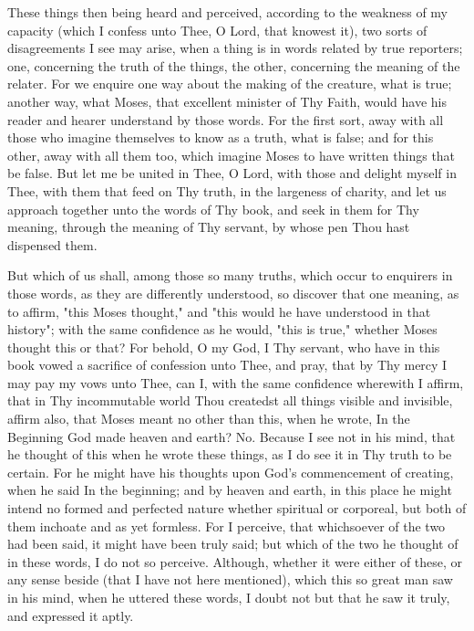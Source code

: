 \documentclass[b5paper,openright,12pt,twoside]{book}
\begin{document}
These things then being heard and perceived, according to the weakness
of my capacity (which I confess unto Thee, O Lord, that knowest it), two
sorts of disagreements I see may arise, when a thing is in words related
by true reporters; one, concerning the truth of the things, the other,
concerning the meaning of the relater. For we enquire one way about
the making of the creature, what is true; another way, what Moses,
that excellent minister of Thy Faith, would have his reader and hearer
understand by those words. For the first sort, away with all those
who imagine themselves to know as a truth, what is false; and for this
other, away with all them too, which imagine Moses to have written
things that be false. But let me be united in Thee, O Lord, with those
and delight myself in Thee, with them that feed on Thy truth, in the
largeness of charity, and let us approach together unto the words of
Thy book, and seek in them for Thy meaning, through the meaning of Thy
servant, by whose pen Thou hast dispensed them.

But which of us shall, among those so many truths, which occur to
enquirers in those words, as they are differently understood, so
discover that one meaning, as to affirm, "this Moses thought," and "this
would he have understood in that history"; with the same confidence
as he would, "this is true," whether Moses thought this or that? For
behold, O my God, I Thy servant, who have in this book vowed a sacrifice
of confession unto Thee, and pray, that by Thy mercy I may pay my vows
unto Thee, can I, with the same confidence wherewith I affirm, that in
Thy incommutable world Thou createdst all things visible and invisible,
affirm also, that Moses meant no other than this, when he wrote, In the
Beginning God made heaven and earth? No. Because I see not in his mind,
that he thought of this when he wrote these things, as I do see it
in Thy truth to be certain. For he might have his thoughts upon God's
commencement of creating, when he said In the beginning; and by heaven
and earth, in this place he might intend no formed and perfected nature
whether spiritual or corporeal, but both of them inchoate and as yet
formless. For I perceive, that whichsoever of the two had been said, it
might have been truly said; but which of the two he thought of in these
words, I do not so perceive. Although, whether it were either of these,
or any sense beside (that I have not here mentioned), which this so
great man saw in his mind, when he uttered these words, I doubt not but
that he saw it truly, and expressed it aptly.
\end{document}
